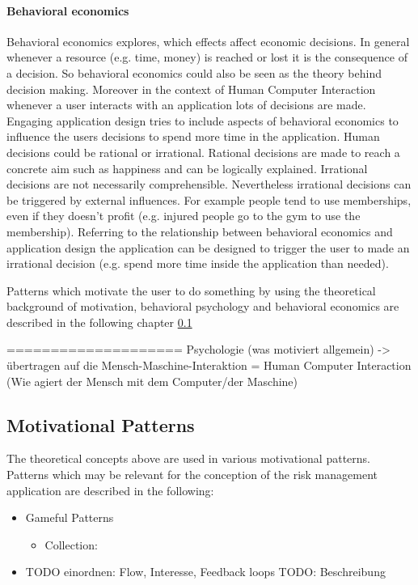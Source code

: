 \paragraph*{Behavioral economics}

Behavioral economics explores, which effects affect economic decisions. In general whenever a resource (e.g. time, money) is reached or lost it is the consequence of a decision. So behavioral economics could also be seen as the theory behind decision making. Moreover in the context of Human Computer Interaction whenever a user interacts with an application 
lots of decisions are made. Engaging application design tries to include aspects of behavioral economics to influence the users decisions to spend more time in the application. 
Human decisions could be rational or irrational. Rational decisions are made to reach a concrete aim such as happiness and can be logically explained. Irrational decisions are not necessarily comprehensible.  Nevertheless irrational decisions can be triggered by external influences. For example people tend to use memberships, even if they doesn't profit (e.g. injured people go to the gym to use the membership).
Referring to the relationship between behavioral economics and application design the application can be designed to trigger the user to made an irrational decision (e.g. spend more time inside the application than needed). \cite[p. 19]{lewisIrresistibleAppsMotivational2014}


Patterns which motivate the user to do something by using the theoretical background of motivation, behavioral psychology and behavioral economics are described in the following chapter \ref{sec:theoryBc}

====================\newline
Psychologie (was motiviert allgemein) -> übertragen auf die Mensch-Maschine-Interaktion = Human Computer Interaction (Wie agiert der Mensch mit dem Computer/der Maschine)

\subsection{Motivational Patterns}
\label{sec:theoryBc}

The theoretical concepts above are used in various motivational patterns. Patterns which may be relevant for the conception of the risk management application are described in the following:

\begin{itemize}
	\item Gameful Patterns
	\begin{itemize}
		\item Collection: 
	\end{itemize}
	
	
	\item TODO einordnen: Flow, Interesse, Feedback loops \newline
	TODO: Beschreibung \cite[p. 19, 20, 21]{bierhoffeditorEnzyklopaediePsychologieSoziale2016}
\end{itemize}

